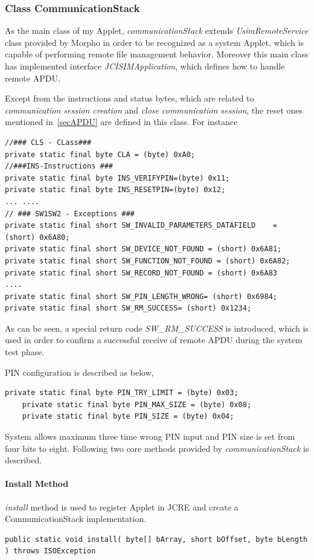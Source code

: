 \subsubsection{Class CommunicationStack} \sloppy
As the main class of my Applet, \emph{communicationStack} extends \emph{UsimRemoteService} class provided by Morpho in order to be recognized as a system Applet, which is capable of performing remote file management behavior. Moreover this main class has implemented interface \emph{JCISIMApplication}, which defines how to handle remote APDU.

Except from the instructions and status bytes, which are related to \emph{communication session creation} and \emph{close communication session},  the reset ones mentioned in~\ref{secAPDU} are defined in this class.
For instance
\begin{Verbatim}[fontsize=\relsize{-1}]
//### CLS - CLass###
private static final byte CLA = (byte) 0xA0;
//###INS-Instructions ###
private static final byte INS_VERIFYPIN=(byte) 0x11;
private static final byte INS_RESETPIN=(byte) 0x12;
... ....
// ### SW1SW2 - Exceptions ###
private static final short SW_INVALID_PARAMETERS_DATAFIELD    = (short) 0x6A80;
private static final short SW_DEVICE_NOT_FOUND = (short) 0x6A81;
private static final short SW_FUNCTION_NOT_FOUND = (short) 0x6A82;
private static final short SW_RECORD_NOT_FOUND = (short) 0x6A83
....
private static final short SW_PIN_LENGTH_WRONG= (short) 0x6984;
private static final short SW_RM_SUCCESS= (short) 0x1234;
\end{Verbatim}

As can be seen, a special return code \emph{SW\_RM\_SUCCESS} is introduced, which is used in order to confirm a successful receive of remote APDU during the system test phase. 

PIN configuration is described as below, 

\begin{Verbatim}[fontsize=\relsize{-1}]
    private static final byte PIN_TRY_LIMIT = (byte) 0x03;
    private static final byte PIN_MAX_SIZE = (byte) 0x08;
    private static final byte PIN_SIZE = (byte) 0x04;
\end{Verbatim}

System allows maximum three time wrong PIN input and PIN size is set from four bits to eight.
Following two core methods provided by \emph{communicationStack} is described.
\paragraph{Install Method}
\emph{install} method is used to register Applet in JCRE and create a CommunicationStack implementation.
\begin{Verbatim}[fontsize=\relsize{-1.5}, frame=lines,framesep=4mm, label=\fbox{\small\emph{doVerifyPIN Handler}}]
public static void install( byte[] bArray, short bOffset, byte bLength ) throws ISOException
\end{Verbatim}

